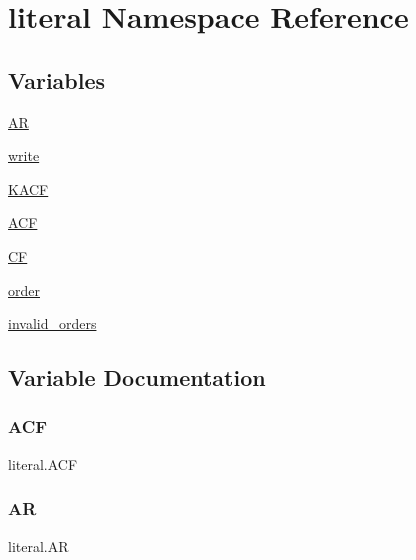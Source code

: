 \hypertarget{namespaceliteral}{}\section{literal Namespace Reference}
\label{namespaceliteral}
\subsection*{Variables}
\begin{DoxyCompactItemize}
\item 
\hyperlink{namespaceliteral_a06231031bb8a3f893b0f179e4413ac8a}{AR}
\item 
\hyperlink{namespaceliteral_a51d0ccb8ce489229015034746f8a429a}{write}
\item 
\hyperlink{namespaceliteral_a03aceb62e02a4b56231db683a691f134}{K\+A\+CF}
\item 
\hyperlink{namespaceliteral_a7e17f32b7f7c103fe69833affe580904}{A\+CF}
\item 
\hyperlink{namespaceliteral_a5ca257011cc79662a3cf27427422cf5c}{CF}
\item 
\hyperlink{namespaceliteral_a289037693684db6c2fe30d889143db1f}{order}
\item 
\hyperlink{namespaceliteral_a81c480fb2054cd0356cc8153c843f896}{invalid\+\_\+orders}
\end{DoxyCompactItemize}


\subsection{Variable Documentation}
\mbox{\label{namespaceliteral_a7e17f32b7f7c103fe69833affe580904}} 
\subsubsection{\texorpdfstring{A\+CF}{ACF}}
{\footnotesize\ttfamily literal.\+A\+CF}

\mbox{\label{namespaceliteral_a06231031bb8a3f893b0f179e4413ac8a}} 
\subsubsection{\texorpdfstring{AR}{AR}}
{\footnotesize\ttfamily literal.\+AR}

